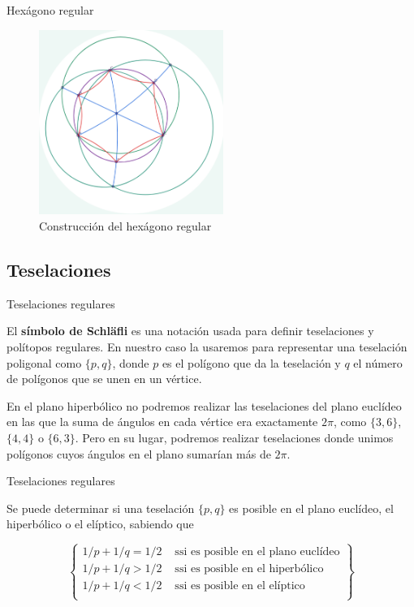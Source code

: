 \documentclass[compress]{beamer}
\begin{document}
\begin{frame}{Hexágono regular}
  \begin{figure}[ht!]
    \centering
    \includegraphics[width=60mm]{./hexagon.png}
    \caption{Construcción del hexágono regular \label{hexagon}}
  \end{figure}
\end{frame}


\subsection{Teselaciones}

\begin{frame}{Teselaciones regulares}
\begin{definition}
  El \textbf{símbolo de Schläfli} es una notación usada para definir
  teselaciones y polítopos regulares. En nuestro caso la usaremos para
  representar una teselación poligonal como $\{p,q\}$, donde $p$ es el
  polígono que da la teselación y $q$ el número de polígonos que se unen
  en un vértice.
\end{definition}

En el plano hiperbólico no podremos realizar las teselaciones del
plano euclídeo en las que la suma de ángulos en cada vértice era
exactamente $2\pi$, como $\{3,6\}$, $\{4,4\}$ o $\{6,3\}$. Pero en su
lugar, podremos realizar teselaciones donde unimos polígonos cuyos
ángulos en el plano sumarían más de $2\pi$.
\end{frame}

\begin{frame}{Teselaciones regulares}
  \begin{theorem}
  Se puede determinar si una teselación $\{p,q\}$ es posible en el plano
  euclídeo, el hiperbólico o el elíptico, sabiendo que

  \[
    \left\{
      \begin{array}{cc}
        1/p + 1/q = 1/2    &\text{ ssi es posible en el plano euclídeo} \\
        1/p + 1/q > 1/2 &\text{ ssi es posible en el hiperbólico} \\
        1/p + 1/q < 1/2 &\text{ ssi es posible en el elíptico} \\
      \end{array}
    \right\}
  \]
\end{theorem}
\end{frame}
\end{document}
